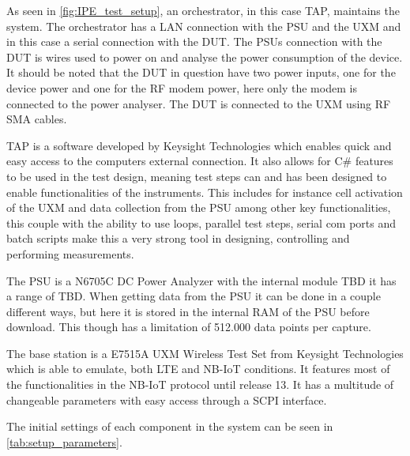As seen in \autoref{fig:IPE_test_setup}, an orchestrator, in this case \gls{TAP}, maintains the system. The orchestrator has a \gls{LAN} connection with the \gls{PSU} and the UXM and in this case a serial connection with the DUT. The \gls{PSU}s connection with the DUT is wires used to power on and analyse the power consumption of the device. It should be noted that the \gls{DUT} in question have two power inputs, one for the device power and one for the RF modem power, here only the modem is connected to the power analyser. The DUT is connected to the UXM using RF SMA cables.

\gls{TAP} is a software developed by Keysight Technologies which enables quick and easy access to the computers external connection. It also allows for C\# features to be used in the test design, meaning test steps can and has been designed to enable functionalities of the instruments. This includes for instance cell activation of the UXM and data collection from the PSU among other key functionalities, this couple with the ability to use loops, parallel test steps, serial com ports and batch scripts make this a very strong tool in designing, controlling and performing measurements. \citep{TAP} 

The \gls{PSU} is a N6705C DC Power Analyzer with the internal module TBD it has a range of TBD. When getting data from the PSU it can be done in a couple different ways, but here it is stored in the internal RAM of the PSU before download. This though has a limitation of 512.000 data points per capture. \citep{PSU}

The base station is a E7515A UXM Wireless Test Set from Keysight Technologies which is able to emulate, both LTE and NB-IoT conditions. It features most of the functionalities in the NB-IoT protocol until release 13. It has a multitude of changeable parameters with easy access through a SCPI interface. \citep{UXM}

The initial settings of each component in the system can be seen in \autoref{tab:setup_parameters}.

